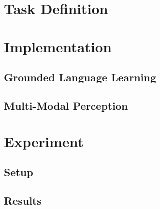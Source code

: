 \documentclass{article}
\begin{document}

\section{Task Definition}

\section{Implementation}

	\subsection{Grounded Language Learning}

	\subsection{Multi-Modal Perception}

\section{Experiment}

	\subsection{Setup}

	\subsection{Results}




\end{document}
